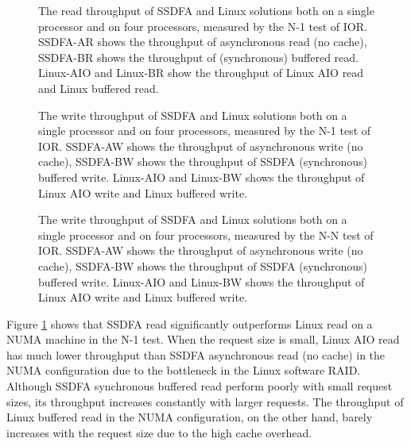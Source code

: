 \begin{figure}[tb]
\begin{center}
\vspace{-15pt}

\vspace{-15pt}
\caption{The read throughput of SSDFA and Linux solutions both on a single
processor and on four processors, measured by the N-1 test of IOR.
SSDFA-AR shows the throughput of asynchronous
read (no cache), SSDFA-BR shows the throughput of (synchronous) buffered read.
Linux-AIO and Linux-BR show the throughput of Linux AIO read and Linux
buffered read.}
\label{IOR-read}
\end{center}
\end{figure}

\begin{figure}[tb]
\begin{center}
\vspace{-15pt}

\vspace{-15pt}
\caption{The write throughput of SSDFA and Linux solutions both on
a single processor and on four processors, measured by the N-1 test of IOR.
SSDFA-AW shows the throughput of asynchronous write
(no cache), SSDFA-BW shows the throughput of SSDFA (synchronous) buffered write.
Linux-AIO and Linux-BW shows the throughput of Linux AIO write and Linux
buffered write.}
\label{IOR-write}
\end{center}
\end{figure}

\begin{figure}[tb]
\begin{center}
\vspace{-15pt}

\vspace{-15pt}
\caption{The write throughput of SSDFA and Linux solutions both on
a single processor and on four processors, measured by the N-N test of IOR.
SSDFA-AW shows the throughput of asynchronous write
(no cache), SSDFA-BW shows the throughput of SSDFA (synchronous) buffered write.
Linux-AIO and Linux-BW shows the throughput of Linux AIO write and Linux
buffered write.}
\label{IOR-write-FPP}
\end{center}
\end{figure}

Figure \ref{IOR-read} shows that SSDFA read significantly outperforms
Linux read on a NUMA machine in the N-1 test. When
the request size is small, Linux AIO read has much
lower throughput than SSDFA asynchronous read (no cache) in the NUMA configuration
due to the bottleneck in the Linux software RAID. Although SSDFA synchronous
buffered read perform poorly with small request sizes, its throughput
increases constantly with larger requests. The throughput of Linux buffered read
in the NUMA configuration, on the other hand, barely increases with the
request size due to the high cache overhead.

